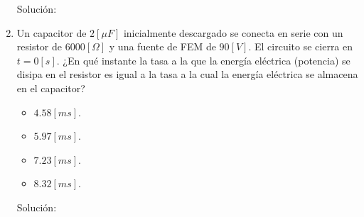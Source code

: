 \documentclass[letter,11pt]{article}
\begin{document}
\begin{enumerate}
Solución: \\

\item Un capacitor de $2 [\mu F]$ inicialmente descargado se conecta en serie
con un resistor de $6000 [\Omega]$ y una fuente de FEM de $90 [V]$. El circuito
se cierra en $t = 0 [s]$. ¿En qué instante la tasa a la que la energía eléctrica
(potencia) se disipa en el resistor es igual a la tasa a la cual la energía
eléctrica se almacena en el capacitor?

\begin{itemize}
    \item $4.58 [ms]$.
    \item $5.97 [ms]$.
    \item $7.23 [ms]$.
    \item $8.32 [ms]$.
\end{itemize}

Solución: \\

\end{enumerate}
\end{document}
